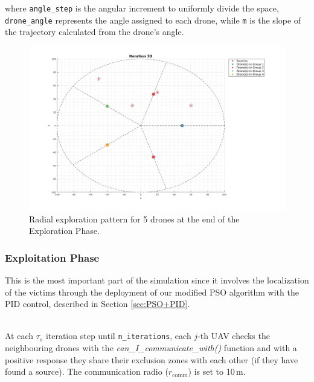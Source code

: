 
\noindent
where \texttt{angle\_step} is the angular increment to uniformly divide the space,
\texttt{drone\_angle} represents the angle assigned to each drone, 
while \texttt{m} is the slope of the trajectory calculated from the drone's angle. 

\begin{figure}
    \centering
    \includegraphics[width=\textwidth]{images/exploration_pattern.jpg} 
    \caption{Radial exploration pattern for 5 drones at the end of the Exploration Phase.}
    \label{fig:exploration_pattern}
\end{figure}

\subsubsection{Exploitation Phase}
This is the most important part of the simulation since it involves
the localization of the victims through the deployment of our modified PSO
algorithm with the PID control, described in Section \ref{sec:PSO+PID}.

\noindent\\
At each $\tau_s$ iteration step until \texttt{n\_iterations},
each $j$-th UAV checks the neighbouring drones with the
\textit{can\_I\_communicate\_with()} function and with a 
positive response they share their exclusion zones with each other
(if they have found a source). The communication radio (\(r_{\text{comm}}\))
is set to 10\,m.

